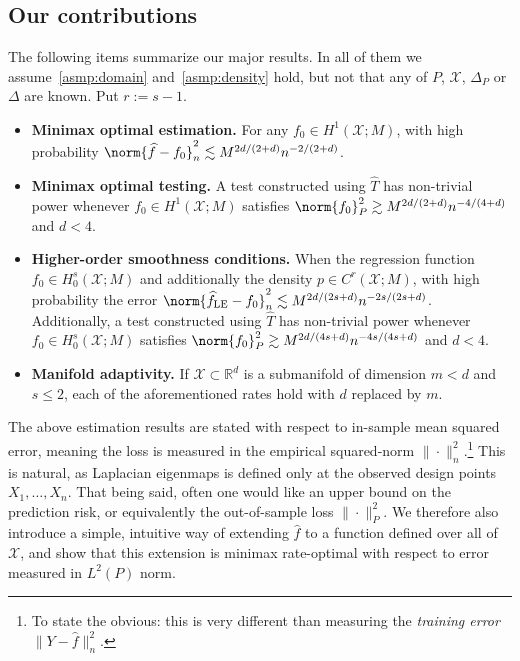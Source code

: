 \documentclass{article}
\newcommand{\Reals}{\mathbb{R}}
\newcommand{\1}{\mathbf{1}}
\newcommand{\Rd}{\Reals^d}
\newcommand{\Xset}{\mathcal{X}}
\newcommand{\mc}[1]{\mathcal{#1}}
\newcommand{\wh}[1]{\widehat{#1}}
\newcommand{\LE}{\mathrm{LE}}
\theoremstyle{alden}
\theoremstyle{aldenthm}
\theoremstyle{definition}
\theoremstyle{remark}
\begin{document}
\subsection{Our contributions}
The following items summarize our major results. In all of them we assume~\ref{asmp:domain} and~\ref{asmp:density} hold, but not that any of $P$, $\mc{X}$, $\Delta_P$ or $\Delta$ are known. Put $r := s - 1$.
\begin{itemize}
	\item \textbf{Minimax optimal estimation.} For any $f_0 \in H^1(\Xset;M)$, with high probability $\norm{\wh{f} - f_0}_{n}^2 \lesssim M^{2d/(2 + d)}n^{-2/(2 + d)}$.
	\item \textbf{Minimax optimal testing.}
	A test constructed using $\wh{T}$ has non-trivial power whenever $f_0 \in H^1(\Xset;M)$ satisfies $\norm{f_0}_{P}^2 \gtrsim M^{2d/(2 + d)}n^{-4/(4 + d)}$ and $d < 4$.
	\item \textbf{Higher-order smoothness conditions.} When the regression function $f_0 \in H_0^s(\Xset;M)$ and additionally the density $p \in C^{r}(\mc{X};M)$, with high probability the error $\norm{\wh{f}_{\LE} - f_0}_{n}^2 \lesssim M^{2d/(2s + d)}n^{-2s/(2s + d)}$. Additionally, a test constructed using $\wh{T}$ has non-trivial power whenever $f_0 \in H_0^s(\Xset;M)$ satisfies $\norm{f_0}_{P}^2 \gtrsim M^{2d/(4s + d)}n^{-4s/(4s + d)}$ and $d < 4$.
	\item \textbf{Manifold adaptivity.}
	If $\mc{X} \subset \Rd$ is a submanifold of dimension $m < d$ and $s \leq 2$, each of the aforementioned rates hold with $d$ replaced by $m$.
\end{itemize}
The above estimation results are stated with respect to in-sample mean squared error, meaning the loss is measured in the empirical squared-norm $\|\cdot\|_n^2$.\footnote{To state the obvious: this is very different than measuring the \emph{training error} $\|Y - \wh{f}\|_n^2$.} This is natural, as Laplacian eigenmaps is defined only at the observed design points $X_1,\ldots,X_n$. That being said, often one would like an upper bound on the prediction risk, or equivalently the out-of-sample loss $\|\cdot\|_P^2$. We therefore also introduce a simple, intuitive way of extending $\wh{f}$ to a function defined over all of $\mc{X}$, and show that this extension is minimax rate-optimal with respect to error measured in $L^2(P)$ norm.
\end{document}
